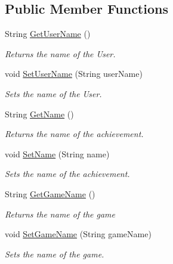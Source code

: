 \subsection*{Public Member Functions}
\begin{DoxyCompactItemize}
\item 
String \hyperlink{classcom_1_1shephertz_1_1app42_1_1paas_1_1sdk_1_1csharp_1_1achievement_1_1_achievement_a97212c5d87ca5e5a495628e71665c240}{Get\+User\+Name} ()
\begin{DoxyCompactList}\small\item\em Returns the name of the User. \end{DoxyCompactList}\item 
void \hyperlink{classcom_1_1shephertz_1_1app42_1_1paas_1_1sdk_1_1csharp_1_1achievement_1_1_achievement_a0862ff851699b4ecd4712bb88c305974}{Set\+User\+Name} (String user\+Name)
\begin{DoxyCompactList}\small\item\em Sets the name of the User. \end{DoxyCompactList}\item 
String \hyperlink{classcom_1_1shephertz_1_1app42_1_1paas_1_1sdk_1_1csharp_1_1achievement_1_1_achievement_ad64693ae2f0d9adbb12d7c3f3707d7cd}{Get\+Name} ()
\begin{DoxyCompactList}\small\item\em Returns the name of the achievement. \end{DoxyCompactList}\item 
void \hyperlink{classcom_1_1shephertz_1_1app42_1_1paas_1_1sdk_1_1csharp_1_1achievement_1_1_achievement_a6c523faacd428bd09face68630777261}{Set\+Name} (String name)
\begin{DoxyCompactList}\small\item\em Sets the name of the achievement. \end{DoxyCompactList}\item 
String \hyperlink{classcom_1_1shephertz_1_1app42_1_1paas_1_1sdk_1_1csharp_1_1achievement_1_1_achievement_abc6f844b53ab88eeedb74d571511f8f3}{Get\+Game\+Name} ()
\begin{DoxyCompactList}\small\item\em Returns the name of the game \end{DoxyCompactList}\item 
void \hyperlink{classcom_1_1shephertz_1_1app42_1_1paas_1_1sdk_1_1csharp_1_1achievement_1_1_achievement_a4b3058b3c6af425db6804de63b159e62}{Set\+Game\+Name} (String game\+Name)
\begin{DoxyCompactList}\small\item\em Sets the name of the game. \end{DoxyCompactList}\item 

\end{DoxyCompactItemize}
